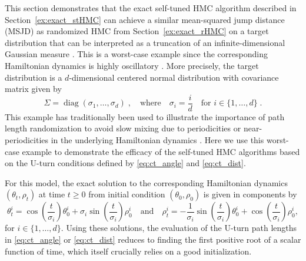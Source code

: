 \documentclass[letterpaper,11pt]{article}
\theoremstyle{plain}%
\theoremstyle{remark}
\begin{document}
This section demonstrates that the exact self-tuned HMC algorithm described in Section~\ref{ex:exact_stHMC} can achieve a similar mean-squared jump distance (MSJD) as  randomized HMC from Section~\ref{ex:exact_rHMC} on a target distribution that can be interpreted as a truncation of an infinite-dimensional Gaussian measure \cite{BePiSaSt2011,BoEb2020}.  This is a worst-case example since the corresponding Hamiltonian dynamics is highly oscillatory \cite{petzold_jay_yen_1997}. More precisely, the target distribution is a $d$-dimensional centered normal distribution with covariance matrix given by 
\begin{equation}\label{eq:sigma_diag}
\Sigma = \operatorname{diag}(\sigma_1, \dots, \sigma_d) \;, 
\quad \text{where} \quad  \sigma_i 
= \frac{i}{d} \quad \text{for $i \in \{1, \dots, d \}$} \;.
\end{equation}
This example has traditionally been used to illustrate the importance of path length randomization to avoid slow mixing due to periodicities or near-periodicities in the  underlying Hamiltonian dynamics \cite{Ne2011,BoSa2017,BoEb2022}.  Here we use this worst-case example to demonstrate the efficacy of the self-tuned HMC algorithms based on the U-turn conditions defined by \eqref{eq:ct_angle} and \eqref{eq:ct_dist}. 

For this model, the exact solution to the corresponding Hamiltonian dynamics $(\theta_t, \rho_t)$ at time $t \ge 0$ from initial condition $(\theta_0, \rho_0)$ is given in components by 
\[
\theta_t^i = \cos\left( \frac{t}{\sigma_i} \right) \theta_0^i + \sigma_i \sin\left( \frac{t}{\sigma_i} \right) \rho_0^i 
%
\quad \textrm{and} \quad
\rho_t^i = - \frac{1}{\sigma_i} \sin\left( \frac{t}{\sigma_i} \right) \theta_0^i + \cos\left( \frac{t}{\sigma_i} \right) \rho_0^i,  
\] 
for $i \in \{1, \dots, d \}$.  Using these solutions, the evaluation of the U-turn path lengths in \eqref{eq:ct_angle} or \eqref{eq:ct_dist} reduces to finding the first positive root of a scalar function of time, which itself crucially relies on a good initialization.  
\end{document}
